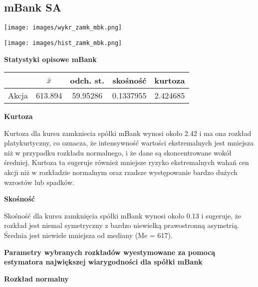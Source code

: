 \documentclass[12pt]{article}
\begin{document}
\clearpage

\subsection{mBank SA}

\vspace{0.5 cm}

\begin{center}
\texttt{[image: images/wykr\_zamk\_mbk.png]}
\end{center}
  \vspace{1 cm}

\begin{center}
\texttt{[image: images/hist\_zamk\_mbk.png]}
\end{center}

\clearpage

{\bf \large Statystyki opisowe mBank}

\vspace{0.5 cm}
\begin{table}[h]
\centering
\begin{tabular}{|c|c|c|c|c|}
\hline
 & \(\bar{x}\) & odch. st. & skośność & kurtoza \\
\hline
Akcja & 613.894 & 59.95286 & 0.1337955 & 2.424685\\
\hline
\end{tabular}
\end{table}
\vspace{0.7 cm}

{\bf Kurtoza}

Kurtoza dla kursu zamkniecia spółki mBank wynosi około 2.42 i ma ona rozkład platykurtyczny, co oznacza, że intensywność wartości ekstremalnych jest mniejsza niż w przypadku rozkładu normalnego, i że dane są skoncentrowane wokół średniej. Kurtoza ta sugeruje również mniejsze ryzyko ekstremalnych wahań cen akcji niż w rozkładzie normalnym oraz rzadsze występowanie bardzo dużych wzrostów lub spadków.

{\bf Skośność}

Skośność dla kursu zamknięcia spółki mBank wynosi około 0.13 i sugeruje, że rozkład jest niemal symetryczny z bardzo niewielką prawostronną asymetrią. Średnia jest niewiele mniejsza od mediany (Me = 617).

\clearpage

{\large\bf{Parametry wybranych rozkładów wyestymowane za pomocą estymatora największej wiarygodności dla spółki mBank}}

\vspace{0.5 cm}
{\bf Rozkład normalny}
\vspace{0.5 cm}
\end{document}
